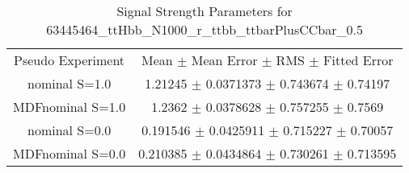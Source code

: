 \begin{table}
\centering
\caption{Signal Strength Parameters for 63445464\_ttHbb\_N1000\_r\_ttbb\_ttbarPlusCCbar\_0.5}
\begin{tabular}{cc}
\toprule
Pseudo Experiment & Mean $\pm$ Mean Error $\pm$ RMS $\pm$ Fitted Error\\
nominal S=1.0 & \num{1.21245} $\pm$ \num{0.0371373} $\pm$ \num{0.743674} $\pm$ \num{0.74197}\\
MDFnominal S=1.0 & \num{1.2362} $\pm$ \num{0.0378628} $\pm$ \num{0.757255} $\pm$ \num{0.7569}\\
nominal S=0.0 & \num{0.191546} $\pm$ \num{0.0425911} $\pm$ \num{0.715227} $\pm$ \num{0.70057}\\
MDFnominal S=0.0 & \num{0.210385} $\pm$ \num{0.0434864} $\pm$ \num{0.730261} $\pm$ \num{0.713595}\\
\bottomrule
\end{tabular}
\end{table}
